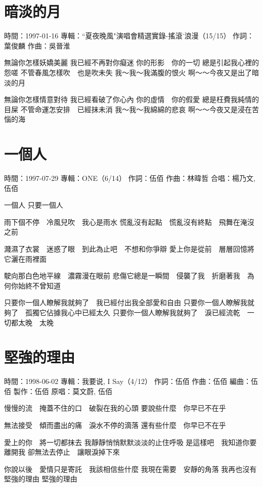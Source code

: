 \documentclass[UTF8,a4paper,oneside,twocolumn,12pt]{ctexbook}
\newcommand{\infopair}[2]{\textbullet #1：#2}
\newcommand{\zc}[1][伍佰]{\infopair{作詞}{#1}}
\newcommand{\zq}[1][伍佰]{\infopair{作曲}{#1}}
\newcommand{\bq}[1][伍佰]{\infopair{編曲}{#1}}
\newcommand{\zj}[1]{\infopair{專輯}{#1}}
\newcommand{\zz}[1]{\infopair{製作}{#1}}
\newcommand{\sj}[1]{\infopair{時間}{#1}}
\newenvironment{info}{\begin{flushleft}\kaishu
	}
	{\end{flushleft}\normalsize\yahei\par}
\newenvironment{lyric}{
	}
{}
\begin{document}
\section{暗淡的月}
\begin{info}
	\sj{1997-01-16}
	\zj{``夏夜晚風"演唱會精選實錄-搖滾˙浪漫（15/15）}
	\zc[葉俊麟]
	\zq[吳晉淮]
\end{info}
\begin{lyric}
	無論你怎樣妖嬌美麗
	我已經不再對你癡迷
	你的形影　你的一切
	總是引起我心裡的怨嗟
	不管春風怎樣吹　也是吹未失
	我～我～我滿腹的恨火
	啊～～今夜又是出了暗淡的月

	無論你怎樣情意對待
	我已經看破了你心內
	你的虛情　你的假愛
	總是枉費我純情的目屎
	不管命運怎安排　已經抹未消
	我～我～我綿綿的悲哀
	啊～～今夜又是浸在苦惱的海
\end{lyric}

\section{一個人}
\begin{info}
	\sj{1997-07-29}
	\zj{ONE（6/14）}
	\zc
	\zq[林暐哲]
	\infopair{合唱}{楊乃文, 伍佰}
\end{info}
\begin{lyric}
	一個人 只要一個人

	雨下個不停　冷風兒吹　我心是雨水
	慌亂沒有起點　慌亂沒有終點　飛舞在淹沒之前

	濺濕了衣裳　迷惑了眼　到此為止吧　不想和你爭辯
	愛上你是從前　層層回憶將它灑在雨裡面

	駛向那白色地平線　濃霧漫在眼前
	悲傷它總是一瞬間　侵襲了我　折磨著我　為何你始終不曾知道

	只要你一個人瞭解我就夠了　我已經付出我全部愛和自由
	只要你一個人瞭解我就夠了　孤獨它佔據我心中已經太久
	只要你一個人瞭解我就夠了　淚已經流乾　一切都太晚　太晚
\end{lyric}

\section{堅強的理由}
\begin{info}
	\sj{1998-06-02}
	\zj{我要说, I Say（4/12）}
	\zc
	\zq
	\bq[伍佰]
	\zz{伍佰}
	\infopair{原唱}{莫文蔚, 伍佰}
\end{info}
\begin{lyric}
	慢慢的流　掩蓋不住的口　破裂在我的心頭
	要說些什麼　你早已不在乎

	無法接受　傾而盡出的痛　淚水不停的滴落
	還有些什麼　你早已不在乎

	愛上的你　將一切都抹去
	我靜靜悄悄默默淡淡的止住呼吸
	是這樣吧　我知道你要離開我
	卻無法去停止　讓眼淚掉下來

	你說以後　愛情只是寄託　我該相信些什麼
	我現在需要　安靜的角落
	我再也沒有　堅強的理由
	堅強的理由
\end{lyric}
\end{document}
